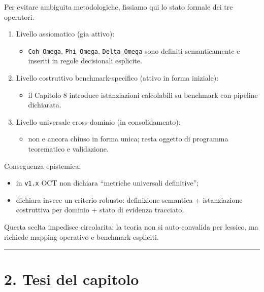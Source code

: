 Per evitare ambiguita metodologiche, fissiamo qui lo stato formale dei tre operatori.

\begin{enumerate}
\def\labelenumi{\arabic{enumi}.}
\tightlist
\item
  Livello assiomatico (gia attivo):

  \begin{itemize}
  \tightlist
  \item
    \texttt{Coh\_Omega}, \texttt{Phi\_Omega}, \texttt{Delta\_Omega} sono definiti semanticamente e inseriti in regole decisionali esplicite.
  \end{itemize}
\item
  Livello costruttivo benchmark-specifico (attivo in forma iniziale):

  \begin{itemize}
  \tightlist
  \item
    il Capitolo 8 introduce istanziazioni calcolabili su benchmark con pipeline dichiarata.
  \end{itemize}
\item
  Livello universale cross-dominio (in consolidamento):

  \begin{itemize}
  \tightlist
  \item
    non e ancora chiuso in forma unica; resta oggetto di programma teorematico e validazione.
  \end{itemize}
\end{enumerate}

Conseguenza epistemica:

\begin{itemize}
\tightlist
\item
  in \texttt{v1.x} OCT non dichiara ``metriche universali definitive'';
\item
  dichiara invece un criterio robusto: definizione semantica + istanziazione costruttiva per dominio + stato di evidenza tracciato.
\end{itemize}

Questa scelta impedisce circolarita: la teoria non si auto-convalida per lessico, ma richiede mapping operativo e benchmark espliciti.

\begin{center}\rule{0.5\linewidth}{0.5pt}\end{center}

\section{2. Tesi del capitolo}

